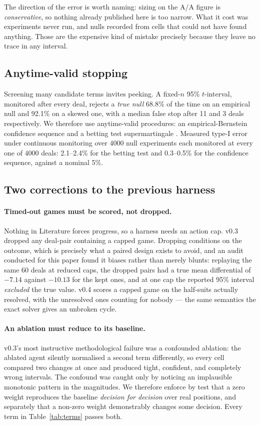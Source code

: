 \documentclass[11pt,letterpaper]{article}
\begin{document}
The direction of the error is worth naming: sizing on the A/A figure is
\emph{conservative}, so nothing already published here is too narrow. What it
cost was experiments never run, and nulls recorded from cells that could not
have found anything. Those are the expensive kind of mistake precisely because
they leave no trace in any interval.

\subsection{Anytime-valid stopping}

Screening many candidate terms invites peeking. A fixed-$n$ 95\% $t$-interval,
monitored after every deal, rejects a \emph{true null} 68.8\% of the time on an
empirical null and 92.1\% on a skewed one, with a median false stop after 11 and
3 deals respectively. We therefore use anytime-valid procedures: an
empirical-Bernstein confidence sequence and a betting test supermartingale
\citep{waudbysmith2024estimating}. Measured type-I error under continuous
monitoring over $4000$ null experiments each monitored at every one of $4000$
deals: 2.1--2.4\% for the betting test and 0.3--0.5\% for the confidence
sequence, against a nominal 5\%.

\subsection{Two corrections to the previous harness}

\paragraph{Timed-out games must be scored, not dropped.} Nothing in Literature
forces progress, so a harness needs an action cap. v0.3 dropped any deal-pair
containing a capped game. Dropping conditions on the outcome, which is precisely
what a paired design exists to avoid, and an audit conducted for this paper
found it biases rather than merely blunts: replaying the same 60 deals at
reduced caps, the dropped pairs had a true mean differential of $-7.14$ against
$-10.13$ for the kept ones, and at one cap the reported 95\% interval
\emph{excluded} the true value. v0.4 scores a capped game on the half-suits
actually resolved, with the unresolved ones counting for nobody --- the same
semantics the exact solver gives an unbroken cycle.

\paragraph{An ablation must reduce to its baseline.} v0.3's most instructive
methodological failure was a confounded ablation: the ablated agent silently
normalised a second term differently, so every cell compared two changes at once
and produced tight, confident, and completely wrong intervals. The confound was
caught only by noticing an implausible monotonic pattern in the magnitudes. We
therefore enforce by test that a zero weight reproduces the baseline
\emph{decision for decision} over real positions, and separately that a non-zero
weight demonstrably changes some decision. Every term in
Table~\ref{tab:terms} passes both.
\end{document}
